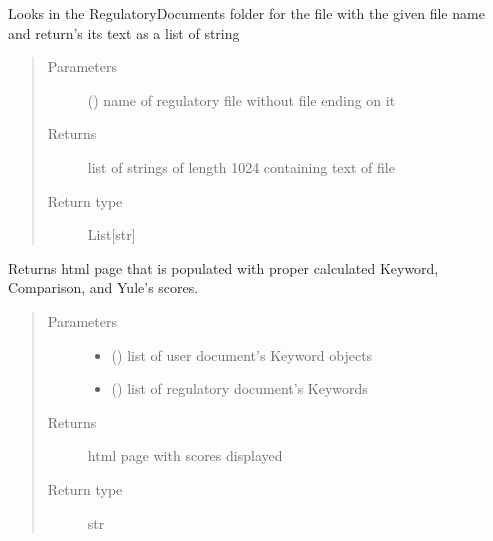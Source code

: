 \documentclass[letterpaper,10pt,english]{sphinxmanual}
\begin{document}

\begin{fulllineitems}
\label{\detokenize{functionsv1:common_functions.getregulatorydoctext}}
Looks in the RegulatoryDocuments folder for the file with the given file name and return’s its text as a list of string
\begin{quote}\begin{description}
\item[{Parameters}] \leavevmode
{} () \textendash{} name of regulatory file without file ending on it

\item[{Returns}] \leavevmode
list of strings of length 1024 containing text of file

\item[{Return type}] \leavevmode
List{[}str{]}

\end{description}\end{quote}

\end{fulllineitems}


\begin{fulllineitems}
\label{\detokenize{functionsv1:common_functions.getscorepage}}
Returns html page that is populated with proper calculated Keyword, Comparison, and Yule’s scores.
\begin{quote}\begin{description}
\item[{Parameters}] \leavevmode\begin{itemize}
\item {} 
 ({\hyperref[\detokenize{KeywordList:module-KeywordList}]{}}) \textendash{} list of user document’s Keyword objects

\item {} 
 ({\hyperref[\detokenize{KeywordList:module-KeywordList}]{}}) \textendash{} list of regulatory document’s Keywords

\end{itemize}

\item[{Returns}] \leavevmode
html page with scores displayed

\item[{Return type}] \leavevmode
str

\end{description}\end{quote}

\end{fulllineitems}
\end{document}
